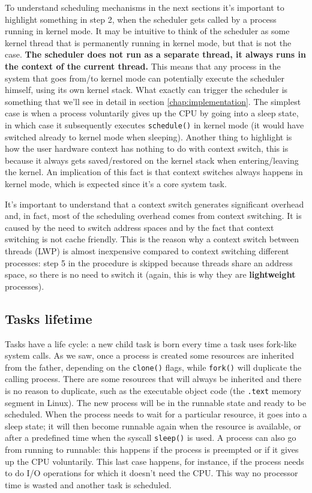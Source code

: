 \documentclass[10pt]{book}
\begin{document}
To understand scheduling mechanisms in the next sections it's important to highlight something in step 2, when the scheduler gets called by a process running in kernel mode. It may be intuitive to think of the scheduler as some kernel thread that is permanently running in kernel mode, but that is not the case. \textbf{The scheduler does not run as a separate thread, it always runs in the context of the current thread.} This means that any process in the system that goes from/to kernel mode can potentially execute the scheduler himself, using its own kernel stack. What exactly can trigger the scheduler is something that we'll see in detail in section \ref{chap:implementation}. The simplest case is when a process voluntarily gives up the CPU by going into a sleep state, in which case it subsequently executes \verb|schedule()| in kernel mode (it would have switched already to kernel mode when sleeping). %
Another thing to highlight is how the user hardware context has nothing to do with context switch, this is because it always gets saved/restored on the kernel stack when entering/leaving the kernel. An implication of this fact is that context switches always happens in kernel mode, which is expected since it's a core system task.

It's important to understand that a context switch generates significant overhead and, in fact, most of the scheduling overhead comes from context switching. It is caused by the need to switch address spaces and by the fact that context switching is not cache friendly. This is the reason why a context switch between threads (LWP) is almost inexpensive compared to context switching different processes: step 5 in the procedure is skipped because threads share an address space, so there is no need to switch it (again, this is why they are \textbf{lightweight} processes).

\subsection{Tasks lifetime} Tasks have a life cycle: a new child task is born every time a task uses fork-like system calls. As we saw, once a process is created some resources are inherited from the father, depending on the \verb|clone()| flags, while \verb|fork()| will duplicate the calling process. There are some resources that will always be inherited and there is no reason to duplicate, such as the executable object code (the \verb|.text| memory segment in Linux). The new process will be in the runnable state and ready to be scheduled. When the process needs to wait for a particular resource, it goes into a sleep state; it will then become runnable again when the resource is available, or after a predefined time when the syscall \verb|sleep()| is used. A process can also go from running to runnable: this happens if the process is preempted or if it gives up the CPU voluntarily. This last case happens, for instance, if the process needs to do I/O operations for which it doesn't need the CPU. This way no processor time is wasted and another task is scheduled.
\end{document}
